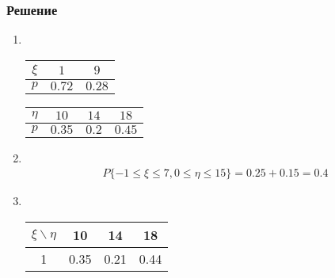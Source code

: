 \documentclass[12pt]{article}
\begin{document}
\subsubsection*{Решение}
\begin{enumerate}
	\item \mbox{}\\
	      \begin{tabular}{|c|c|c|}
		      \hline
		      $\xi $ & $1$    & $9$    \\
		      \hline
		      $p$    & $0.72$ & $0.28$ \\
		      \hline
	      \end{tabular}
	      \begin{tabular}{|c|c|c|c|}
		      \hline
		      $\eta $ & $10$   & $14$  & $18$   \\
		      \hline
		      $p$     & $0.35$ & $0.2$ & $0.45$ \\
		      \hline
	      \end{tabular}

	\item \mbox{}\\
	      \begin{gather*}
		      P\{-1 \leq \xi \leq 7, 0 \leq \eta \leq 15\} = 0.25 + 0.15 = 0.4
	      \end{gather*}

	\item \mbox{}\\
	      \begin{tabular}{|c|c|c|c|}
		      \hline
		      $\xi \backslash \eta$ & 10   & 14   & 18   \\
		      \hline
		      1                     & 0.35 & 0.21 & 0.44 \\
		      \hline
	      \end{tabular}


\end{enumerate}
\end{document}
